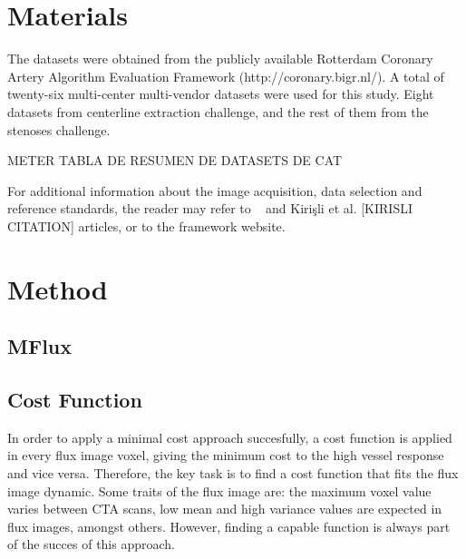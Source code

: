 \section{Materials}
 
The datasets were obtained from the publicly available Rotterdam Coronary Artery Algorithm Evaluation Framework (http://coronary.bigr.nl/). A total of twenty-six multi-center multi-vendor datasets were used for this study. Eight datasets from centerline extraction challenge, and the rest of them from the stenoses challenge. 

METER TABLA DE RESUMEN DE DATASETS DE CAT

For additional information about the image acquisition, data selection and reference standards, the reader may refer to ~\citep{Metz2008} and Kirişli et al. [KIRISLI CITATION] articles, or to the framework website.


\section{Method}

\subsection{MFlux}

\subsection{Cost Function}

In order to apply a minimal cost approach succesfully, a cost function is applied in every flux image voxel, giving the minimum cost to the high vessel response and vice versa. Therefore, the key task is to find a cost function that fits the flux image dynamic. Some traits of the flux image are: the maximum voxel value varies between CTA scans, low mean and high variance values are expected in flux images, amongst others. However, finding a capable function is always part of the succes of this approach.

